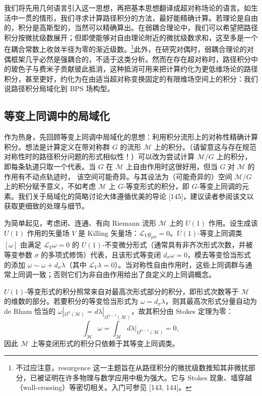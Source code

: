我们将先用几何语言引入这一思想，再把基本思想翻译成超对称场论的语言。如生活中一贯的情形，我们寻求计算路径积分的方法，最好能精确计算。若理论是自由的，积分是高斯型的，当然可以精确算出。在弱耦合理论中，我们可以希望把路径积分按微扰级数展开；但即使能够对自由理论附近的微扰级数求和，这至多是一个在耦合常数上收敛半径为零的渐近级数。\footnote{不过应注意，resurgence 这一主题旨在从路径积分的微扰级数推知其非微扰部分，已被证明在许多物理与数学应用中极为强大。它与 Stokes 现象、墙穿越（wall-crossing）等密切相关。入门可参见 [143, 144]。}此外，在研究对偶时，弱耦合理论的对偶框架几乎必然是强耦合的，不适于这类分析。然而在存在超对称时，路径积分中的玻色子与费米子贡献彼此抵消，这种抵消可用来把计算约化为更低维场论的路径积分，甚至更好，约化为在由适当超对称变换固定的有限维场空间上的积分：我们说路径积分局域化到 BPS 场构型。

\subsection{等变上同调中的局域化}

作为热身，先回顾等变上同调中局域化的思想：利用积分流形上的对称性精确计算积分。想法是计算定义在带对称群 $G$ 的流形 $\mathcal{M}$ 上的积分。（请留意这与存在规范对称性时的路径积分问题的形式相似性！）可以改为尝试计算 $\mathcal{M}/G$ 上的积分，即每条轨道只取一个代表。当 $G$ 在 $\mathcal{M}$ 上自由作用时这很好用，但当 $G$ 对 $\mathcal{M}$ 的作用有不动点轨迹时，
该空间可能奇异。与其设法为（可能奇异的）空间 $\mathcal{M}/G$ 上的积分赋予意义，不如考虑 $\mathcal{M}$ 上 $G$-等变形式的积分，即 $G$-等变上同调的元素。我们关于局域化的简略讨论大体遵循优美的导论 [145]，建议读者参阅该文以获取更细致的处理与细节。

为简单起见，考虑闭、连通、有向 Riemann 流形 $\mathcal{M}$ 上的 $U(1)$ 作用。设生成该 $U(1)$ 作用的矢量场 $V$ 是 Killing 矢量场：$\mathcal{L}_V g_{\mu\nu}=0$。$U(1)$-等变上同调类 $[\omega]$ 由满足 $\mathcal{L}_V\omega=0$ 的 $U(1)$-不变微分形式（通常具有非齐次形式次数，并被等变参数 $\sigma$ 的多项式修饰）代表，且该形式等变闭 $d_\sigma\omega=0$，模去等变恰当形式的添加 $\omega\sim\omega+d_\sigma\lambda$（其中 $\mathcal{L}_V\lambda=0$）。当对称性自由作用时，这些上同调群与通常上同调一致；否则它们为非自由作用给出了良定义的上同调概念。

$U(1)$-等变形式的积分照常来自对最高次形式部分的积分，即形式次数等于 $\mathcal{M}$ 的维数的部分。若要积分的等变恰当形式为 $\omega=d_\sigma\lambda$，则其最高次形式分量自动为 de Rham 恰当的 $\omega|_{\Omega^n(\mathcal{M})}=d\lambda|_{\Omega^{n-1}(\mathcal{M})}$，故其积分由 Stokes 定理为零：
\begin{equation}\tag{A.1}
\int_{\mathcal{M}}\omega = \int_{\mathcal{M}} d\lambda|_{\Omega^{n-1}(\mathcal{M})} = 0,
\end{equation}
因此 $\mathcal{M}$ 上等变闭形式的积分只依赖于其等变上同调类。

